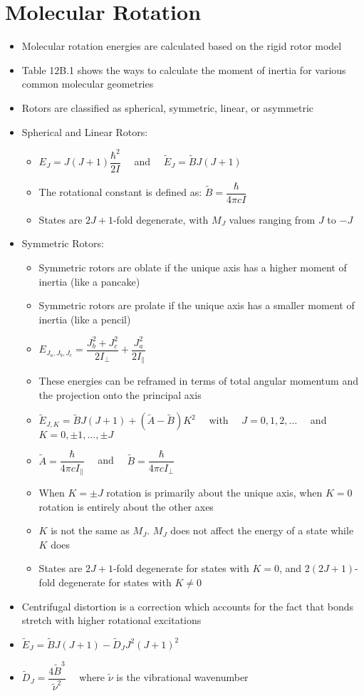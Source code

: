 \documentclass[12pt, openany, letterpaper]{memoir}
\begin{document}
\section{Molecular Rotation}
\begin{itemize}
	\item Molecular rotation energies are calculated based on the rigid rotor model
	\item Table 12B.1 shows the ways to calculate the moment of inertia for various common molecular geometries
	\item Rotors are classified as spherical, symmetric, linear, or asymmetric
	\item Spherical and Linear Rotors:
	\begin{itemize}
		\item $E_J=J(J+1)\dfrac{\hbar^2}{2I}$ ~~and~~ $\tilde{E}_J = \tilde{B}J(J+1)$
		\item The rotational constant is defined as: $\tilde{B}=\dfrac{\hbar}{4\pi cI}$
		\item States are $2J+1$-fold degenerate, with $M_J$ values ranging from $J$ to $-J$
	\end{itemize}
	\item Symmetric Rotors:
	\begin{itemize}
		\item Symmetric rotors are oblate if the unique axis has a higher moment of inertia (like a pancake)
		\item Symmetric rotors are prolate if the unique axis has a smaller moment of inertia (like a pencil)
		\item $E_{J_a,J_b,J_c}=\dfrac{J_b^2+J_c^2}{2I_{\perp}}+\dfrac{J_a^2}{2I_{\parallel}}$
		\item These energies can be reframed in terms of total angular momentum and the projection onto the principal axis
		\item $\tilde{E}_{J,K}=\tilde{B}J(J+1)+\left(\tilde{A}-\tilde{B}\right)K^2$ ~~with~~ $J=0,1,2,\ldots$ ~~and~~ $K = 0, \pm 1, \ldots , \pm J$
		\item $\tilde{A}=\dfrac{\hbar}{4\pi cI_{\parallel}}$ ~~and~~ $\tilde{B} = \dfrac{\hbar}{4\pi cI_{\perp}}$
		\item When $K=\pm J$ rotation is primarily about the unique axis, when $K=0$ rotation is entirely about the other axes
		\item $K$ is not the same as $M_J$. $M_J$ does not affect the energy of a state while $K$ does
		\item States are $2J+1$-fold degenerate for states with $K=0$, and $2(2J+1)$-fold degenerate for states with $K\neq0$
	\end{itemize}
	\item Centrifugal distortion is a correction which accounts for the fact that bonds stretch with higher rotational excitations
	\item $\tilde{E}_J = \tilde{B}J(J+1)-\tilde{D}_J J^2(J+1)^2$ 
	\item $\tilde{D}_J = \dfrac{4\tilde{B}^3}{\tilde{\nu}^2}$ ~~where $\tilde{\nu}$ is the vibrational wavenumber
\end{itemize}
\end{document}
